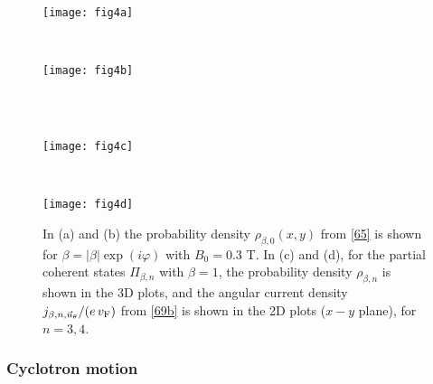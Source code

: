 \documentclass[aps,showpacs,showkeys]{revtex4}
\begin{document}
\begin{figure}[htb]
	\centering
	\begin{minipage}[b]{0.33\textwidth}
		\texttt{[image: fig4a]}\\
		\label{fig:rho_beta0_i}
	\end{minipage}
\hspace{3cm}
	~ %
	\begin{minipage}[b]{0.33\textwidth}
		\texttt{[image: fig4b]}\\
		\label{fig:rho_beta0_ii}
	\end{minipage}
	\\ [2ex]
	~ %
	\begin{minipage}[b]{0.33\textwidth}
		\texttt{[image: fig4c]}\\
		\label{fig:j_beta1_i}
	\end{minipage}
\hspace{3cm}
	~ %
	\begin{minipage}[b]{0.33\textwidth}
		\texttt{[image: fig4d]}\\
		\label{fig:j_beta1_ii}
	\end{minipage}
	\caption{\label{fig:rho_j_beta1}In (a) and (b) the probability density $\rho_{\beta,0}(x,y)$ from \eqref{65} is shown for $\beta=\vert\beta\vert\exp(i\varphi)$ with $B_{0}=0.3$ T. In (c) and (d), for the partial coherent states $\Pi_{\beta,n}$ with $\beta=1$, the probability density $\rho_{\beta,n}$ is shown in the 3D plots, and the angular current density $j_{\beta,n,\vec{u}_\theta}/(e\,v_{\rm F})$ from \eqref{69b} is shown in the 2D plots ($x-y$ plane), for $n=3,4$.}
\end{figure}


\subsubsection{Cyclotron motion}
\end{document}

